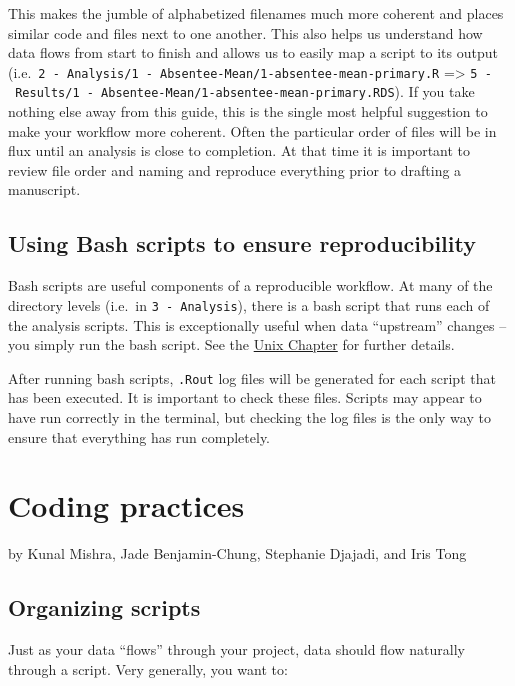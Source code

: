 \documentclass[
]{book}
\begin{document}
This makes the jumble of alphabetized filenames much more coherent and places similar code and files next to one another. This also helps us understand how data flows from start to finish and allows us to easily map a script to its output (i.e.~\texttt{2\ -\ Analysis/1\ -\ Absentee-Mean/1-absentee-mean-primary.R} =\textgreater{} \texttt{5\ -\ Results/1\ -\ Absentee-Mean/1-absentee-mean-primary.RDS}). If you take nothing else away from this guide, this is the single most helpful suggestion to make your workflow more coherent. Often the particular order of files will be in flux until an analysis is close to completion. At that time it is important to review file order and naming and reproduce everything prior to drafting a manuscript.

\section{Using Bash scripts to ensure reproducibility}\label{using-bash-scripts-to-ensure-reproducibility}

Bash scripts are useful components of a reproducible workflow. At many of the directory levels (i.e.~in \texttt{3\ -\ Analysis}), there is a bash script that runs each of the analysis scripts. This is exceptionally useful when data ``upstream'' changes -- you simply run the bash script. See the \hyperref[unix]{Unix Chapter} for further details.

After running bash scripts, \texttt{.Rout} log files will be generated for each script that has been executed. It is important to check these files. Scripts may appear to have run correctly in the terminal, but checking the log files is the only way to ensure that everything has run completely.

\chapter{Coding practices}\label{coding-practices}

by Kunal Mishra, Jade Benjamin-Chung, Stephanie Djajadi, and Iris Tong

\section{Organizing scripts}\label{organizing-scripts}

Just as your data ``flows'' through your project, data should flow naturally through a script. Very generally, you want to:
\end{document}
